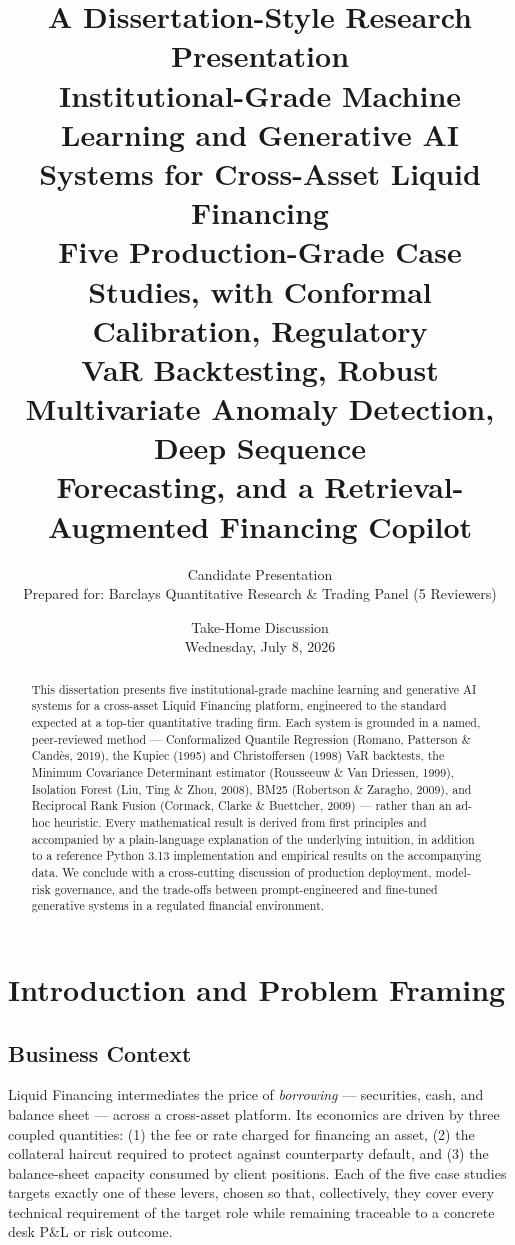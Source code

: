 \documentclass[11pt]{report}
\title{
  \vspace{-1.5cm}
  {\Large\color{steel}A Dissertation-Style Research Presentation}\\[0.4cm]
  {\huge\bfseries\color{navy} Institutional-Grade Machine Learning and Generative AI\\ Systems for Cross-Asset Liquid Financing}\\[0.6cm]
  {\large\color{steel}Five Production-Grade Case Studies, with Conformal Calibration, Regulatory\\
  VaR Backtesting, Robust Multivariate Anomaly Detection, Deep Sequence\\
  Forecasting, and a Retrieval-Augmented Financing Copilot}
}
\author{Candidate Presentation \\ \small Prepared for: Barclays Quantitative Research \& Trading Panel (5 Reviewers)}
\date{Take-Home Discussion \\ Wednesday, July 8, 2026}
\begin{document}
\maketitle
\thispagestyle{empty}

\begin{abstract}
\noindent This dissertation presents five institutional-grade machine learning and generative AI
systems for a cross-asset Liquid Financing platform, engineered to the standard expected at a
top-tier quantitative trading firm. Each system is grounded in a named, peer-reviewed method —
Conformalized Quantile Regression (Romano, Patterson \& Candès, 2019), the Kupiec (1995) and
Christoffersen (1998) VaR backtests, the Minimum Covariance Determinant estimator (Rousseeuw \& Van
Driessen, 1999), Isolation Forest (Liu, Ting \& Zhou, 2008), BM25 (Robertson \& Zaragho, 2009), and
Reciprocal Rank Fusion (Cormack, Clarke \& Buettcher, 2009) — rather than an ad-hoc heuristic. Every
mathematical result is derived from first principles and accompanied by a plain-language explanation
of the underlying intuition, in addition to a reference Python 3.13 implementation and empirical
results on the accompanying data. We conclude with a cross-cutting discussion of production
deployment, model-risk governance, and the trade-offs between prompt-engineered and fine-tuned
generative systems in a regulated financial environment.
\end{abstract}

\tableofcontents
\listoffigures

\chapter{Introduction and Problem Framing}

\section{Business Context}
Liquid Financing intermediates the price of \emph{borrowing} — securities, cash, and balance sheet —
across a cross-asset platform. Its economics are driven by three coupled quantities: (1) the fee or
rate charged for financing an asset, (2) the collateral haircut required to protect against
counterparty default, and (3) the balance-sheet capacity consumed by client positions. Each of the
five case studies targets exactly one of these levers, chosen so that, collectively, they cover every
technical requirement of the target role while remaining traceable to a concrete desk P\&L or risk
outcome.
\end{document}
